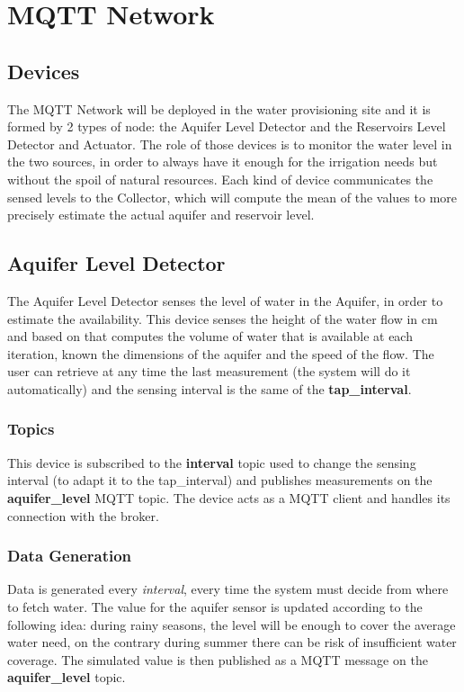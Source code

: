 \section{MQTT Network}

\subsection{Devices}
The MQTT Network will be deployed in the water provisioning site and it is formed by 2 types of node: the Aquifer Level Detector and the Reservoirs Level Detector and Actuator. The role of those devices is to monitor the water level in the two sources, in order to always have it enough for the irrigation needs but without the spoil of natural resources. Each kind of device communicates the sensed levels to the Collector, which will compute the mean of the values to more precisely estimate the actual aquifer and reservoir level.


\subsection{Aquifer Level Detector}
The Aquifer Level Detector senses the level of water in the Aquifer, in order to estimate the availability. This device senses the height of the water flow in cm and based on that computes the volume of water that is available at each iteration, known the dimensions of the aquifer and the speed of the flow. The user can retrieve at any time the last measurement (the system will do it automatically) and the sensing interval is the same of the \textbf{tap\_interval}.

\subsubsection{Topics}
This device is subscribed to the \textbf{interval} topic used to change the sensing interval (to adapt it to the tap\_interval) and publishes measurements on the \textbf{aquifer\_level} MQTT topic.
The device acts as a MQTT client and handles its connection with the broker.

\subsubsection{Data Generation}
Data is generated every \textit{interval}, every time the system must decide from where to fetch water. The value for the aquifer sensor is updated according to the following idea: during rainy seasons, the level will be enough to cover the average water need, on the contrary during summer there can be risk of insufficient water coverage. The simulated value is then published as a MQTT message on the \textbf{aquifer\_level} topic.


